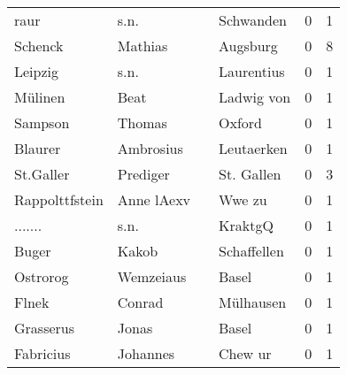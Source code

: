 \begin{tabular}{llllrr}
                     raur &                               s.n. &             &                                   Schwanden &          0 &         1 \\
                  Schenck &                            Mathias &             &                                    Augsburg &          0 &         8 \\
                  Leipzig &                               s.n. &             &                                  Laurentius &          0 &         1 \\
                  Mülinen &                               Beat &             &                                  Ladwig von &          0 &         1 \\
                  Sampson &                             Thomas &             &                                      Oxford &          0 &         1 \\
                  Blaurer &                          Ambrosius &             &                                  Leutaerken &          0 &         1 \\
                St.Galler &                           Prediger &             &                                  St. Gallen &          0 &         3 \\
           Rappolttfstein &                         Anne lAexv &             &                                      Wwe zu &          0 &         1 \\
                  ....... &                               s.n. &             &                                     KraktgQ &          0 &         1 \\
                    Buger &                              Kakob &             &                                 Schaffellen &          0 &         1 \\
                 Ostrorog &                          Wemzeiaus &             &                                       Basel &          0 &         1 \\
                    Flnek &                             Conrad &             &                                   Mülhausen &          0 &         1 \\
                Grasserus &                              Jonas &             &                                       Basel &          0 &         1 \\
                Fabricius &                           Johannes &             &                                     Chew ur &          0 &         1 \\

\end{tabular}
